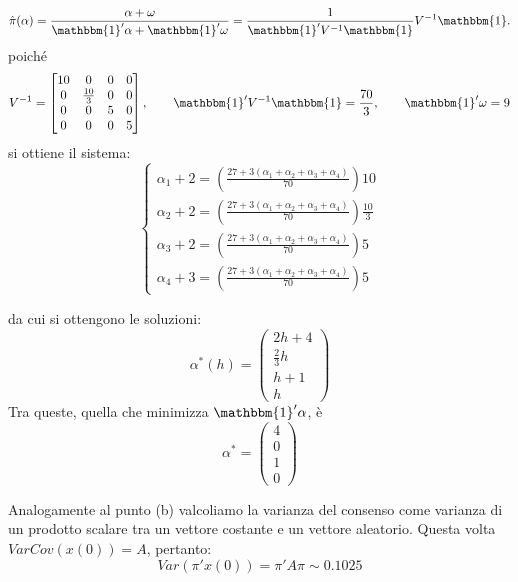 \begin{alphaparts}
    \[\hat{\pi}(\alpha) = \frac{\alpha+ \omega}{\mathbbm{1}'\alpha+\mathbbm{1}'\omega} = \frac{1}{\mathbbm{1}'V^{-1}\mathbbm{1}}V^{-1}\mathbbm{1}. \]
    poiché
    \[V^{-1} = \begin{bmatrix}
        10 & 0 & 0 & 0 \\
        0 & \frac{10}{3} & 0 & 0 \\
        0 & 0 & 5 & 0\\
        0 & 0 & 0 & 5
    \end{bmatrix}, \quad\quad \mathbbm{1}'V^{-1}\mathbbm{1} = \frac{70}{3}, \quad\quad \mathbbm{1}'\omega = 9 \]
    si ottiene il sistema:
    \[\begin{cases}
        \alpha_1 + 2 = \left(\frac{27+ 3(\alpha_1 + \alpha_2 + \alpha_3 + \alpha_4)}{70}\right)10\\
        \alpha_2 + 2 = \left(\frac{27+ 3(\alpha_1 + \alpha_2 + \alpha_3 + \alpha_4)}{70}\right) \frac{10}{3}\\
        \alpha_3+ 2 = \left(\frac{27+ 3(\alpha_1 + \alpha_2 + \alpha_3 + \alpha_4)}{70}\right) 5\\
        \alpha_4 + 3 = \left(\frac{27+ 3(\alpha_1 + \alpha_2 + \alpha_3 + \alpha_4)}{70}\right) 5
    \end{cases}\]

    da cui si ottengono le soluzioni:
    \[\alpha^*(h) = \begin{pmatrix}
        2h+ 4 \\ \frac{2}{3}h \\ h+ 1 \\ h
    \end{pmatrix}\]
    Tra queste, quella che minimizza \(\mathbbm{1}'\alpha\), è
    \[\alpha^* = \begin{pmatrix}
        4 \\ 0 \\ 1 \\ 0
    \end{pmatrix}\] 

    \questionpart %
    Analogamente al punto (b) valcoliamo la varianza del consenso come varianza di un prodotto scalare tra un vettore costante e un vettore aleatorio. Questa volta \(VarCov(x(0))= A\), pertanto:
    \[Var(\pi'x(0)) = \pi'A\pi \sim 0.1025\]

    \questionpart %



    
\end{alphaparts}
